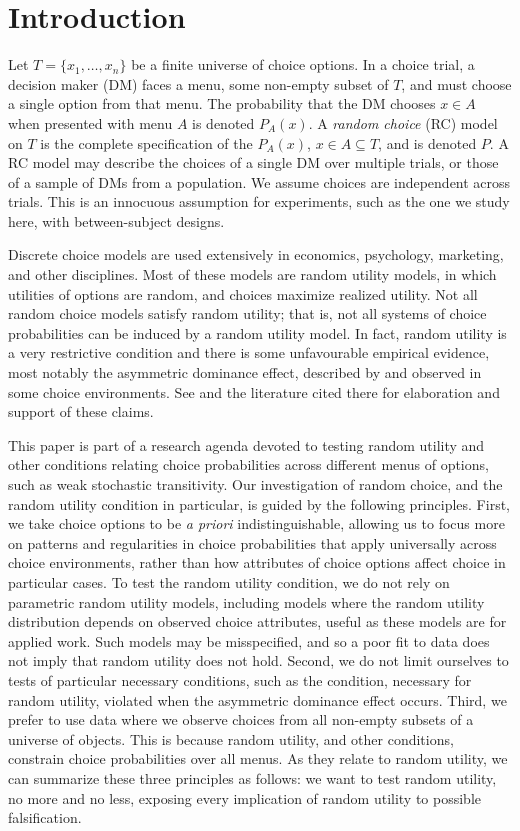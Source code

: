 \documentclass[11pt,letter]{article}
\begin{document}
\section{Introduction}

Let $T = \{x_1,\dots,x_n\}$ be a finite universe of choice options.
In a choice trial, a decision maker (DM) faces a menu, some non-empty subset of $T$, and must choose a single option from that menu.
The probability that the DM chooses $x \in A$ when presented with menu $A$ is denoted $P_A(x)$.
A {\em random choice} (RC) model on $T$ is the complete specification of the $P_A(x)$, $x \in A \subseteq T$, and is denoted $P$.
A RC model may describe the choices of a single DM over multiple trials, or those of a sample of DMs from a population.
We assume choices are independent across trials.
This is an innocuous assumption for experiments, such as the one we study here, with between-subject designs.

Discrete choice models are used extensively in economics, psychology, marketing, and other disciplines.
Most of these models are random utility models, in which utilities of options are random, and choices maximize realized utility.
Not all random choice models satisfy random utility; that is, not all systems of choice probabilities can be induced by a random utility model.
In fact, random utility is a very restrictive condition and there is some unfavourable empirical evidence, most notably the asymmetric dominance effect, described by  and observed in some choice environments.
See  and the literature cited there for elaboration and support of these claims.

This paper is part of a research agenda devoted to testing random utility and other conditions relating choice probabilities across different menus of options, such as weak stochastic transitivity.
Our investigation of random choice, and the random utility condition in particular, is guided by the following principles.
First, we take choice options to be {\em a priori} indistinguishable, allowing us to focus more on patterns and regularities in choice probabilities that apply universally across choice environments, rather than how attributes of choice options affect choice in particular cases.
To test the random utility condition, we do not rely on parametric random utility models, including models where the random utility distribution depends on observed choice attributes, useful as these models are for applied work.
Such models may be misspecified, and so a poor fit to data does not imply that random utility does not hold.
Second, we do not limit ourselves to tests of particular necessary conditions, such as the condition, necessary for random utility, violated when the asymmetric dominance effect occurs.
Third, we prefer to use data where we observe choices from all non-empty subsets of a universe of objects.
This is because random utility, and other conditions, constrain choice probabilities over all menus.
As they relate to random utility, we can summarize these three principles as follows: we want to test random utility, no more and no less, exposing every implication of random utility to possible falsification.
\end{document}
